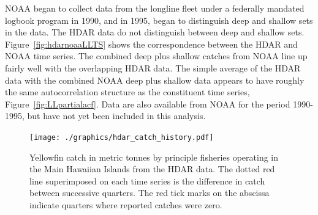 \documentclass[12pt,letterpaper,twoside]{article}
\begin{document}
NOAA began to collect data from the longline fleet under a federally
mandated logbook program in 1990, and in 1995, began to distinguish
deep and shallow sets in the data. The HDAR data do not
distinguish between deep and shallow sets.
Figure~\ref{fig:hdarnoaaLLTS} shows the correspondence between the
HDAR and NOAA time series. The combined deep plus shallow catches from
NOAA line up fairly well with the overlapping HDAR data. The simple
average of the HDAR data with the combined NOAA deep plus shallow data
appears to have roughly the same autocorrelation structure as the
constituent time series, Figure~\ref{fig:LLpartialacf}.
Data are also available from NOAA for the period 1990-1995, but
have not yet been included in this analysis.


\begin{figure}
\begin{center}
\texttt{[image: ./graphics/hdar\_catch\_history.pdf]}
\caption{\label{fig:hdarTS}
Yellowfin catch in metric tonnes by principle fisheries operating in
the Main Hawaiian Islands from the HDAR data.
The dotted red line superimposed on each time series is the difference in
catch between successive quarters.
The red tick marks on the abscissa indicate quarters where reported
catches were zero.
}
\end{center}
\end{figure}
\end{document}
